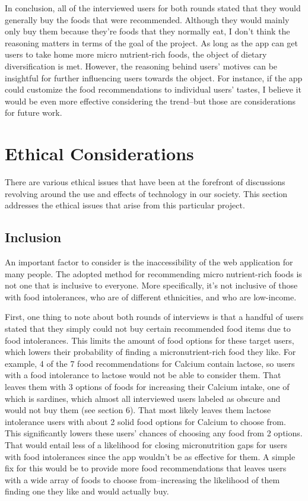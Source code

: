 \documentclass[10pt,twocolumn]{article}
\begin{document}
In conclusion, all of the interviewed users for both rounds stated that they would generally buy the foods that were recommended. Although they would mainly only buy them because they’re foods that they normally eat, I don’t think the reasoning matters in terms of the goal of the project. As long as the app can get users to take home more micro nutrient-rich foods, the object of dietary diversification is met. However, the reasoning behind users’ motives can be insightful for further influencing users towards the object. For instance, if the app could customize the food recommendations to individual users’ tastes, I believe it would be even more effective considering the trend–but those are considerations for future work. 

\section{Ethical Considerations}

There are various ethical issues that have been at the forefront of discussions revolving around the use and effects of technology in our society. This section addresses the ethical issues that arise from this particular project. 

\subsection{Inclusion}

An important factor to consider is the inaccessibility of the web application for many people. The adopted method for recommending micro nutrient-rich foods is not one that is inclusive to everyone. More specifically, it’s not inclusive of those with food intolerances, who are of different ethnicities, and who are low-income. 

First, one thing to note about both rounds of interviews is that a handful of users stated that they simply could not buy certain recommended food items due to food intolerances. This limits the amount of food options for these target users, which lowers their probability of finding a micronutrient-rich food they like. For example, 4 of the 7 food recommendations for Calcium contain lactose, so users with a food intolerance to lactose would not be able to consider them. That leaves them with 3 options of foods for increasing their Calcium intake, one of which is sardines, which almost all interviewed users labeled as obscure and would not buy them (see section 6). That most likely leaves them lactose intolerance users with about 2 solid food options for Calcium to choose from. This significantly lowers these users’ chances of choosing any food from 2 options. That would entail less of a likelihood for closing micronutrition gaps for users with food intolerances since the app wouldn’t be as effective for them. A simple fix for this would be to provide more food recommendations that leaves users with a wide array of foods to choose from–increasing the likelihood of them finding one they like and would actually buy. 
\end{document}
